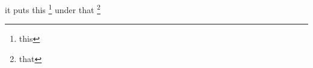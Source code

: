 \documentclass{beamer}
\begin{document}
\begin{frame}
it puts this \footnote{this} under that \footnote{that}
\end{frame}
\end{document}
